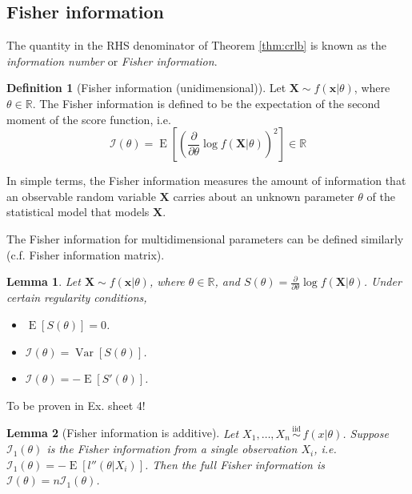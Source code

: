\documentclass[
]{book}
\providecommand{\tightlist}{%
  \setlength{\itemsep}{0pt}\setlength{\parskip}{0pt}}
\newcommand{\bx}{{\boldsymbol x}}
\newcommand{\bX}{{\boldsymbol X}}
\DeclareMathOperator{\E}{E}
\DeclareMathOperator{\Var}{Var}
\newcommand{\iid}{\,\overset{\text{iid}}{\sim}\,}
\newcommand{\bbR}{\mathbb{R}}
\newcommand{\cI}{{\mathcal I}}
\newtheorem{lemma}{Lemma}[chapter]
\theoremstyle{definition}
\newtheorem{definition}{Definition}[chapter]
\theoremstyle{definition}
\theoremstyle{definition}
\theoremstyle{definition}
\theoremstyle{remark}
\begin{document}
\hypertarget{fisher-information}{%
\subsection{Fisher information}\label{fisher-information}}

The quantity in the RHS denominator of Theorem \ref{thm:crlb} is known as the \emph{information number} or \emph{Fisher information}.

\begin{definition}[Fisher information (unidimensional)]
Let \(\bX\sim f(\bx|\theta)\), where \(\theta\in\bbR\).
The Fisher information is defined to be the expectation of the second
moment of the score function, i.e.
\[\cI(\theta) = \E\left[ \left( \frac{\partial}{\partial \theta} \log f(\bX|\theta) \right)^2 \right] \in \bbR\]
\end{definition}

In simple terms, the Fisher information measures the amount of information that an observable random variable \(\bX\) carries about an unknown parameter \(\theta\) of the statistical model that models \(\bX\).

The Fisher information for multidimensional parameters can be defined similarly (c.f. Fisher information matrix).

\begin{lemma}

Let \(\bX\sim f(\bx|\theta)\), where \(\theta\in\bbR\), and \(S(\theta)=\frac{\partial}{\partial \theta} \log f(\bX|\theta)\). Under certain regularity conditions,

\begin{itemize}
\tightlist
\item
  \(\E [S(\theta)] = 0\).
\item
  \(\cI(\theta) = \Var[S(\theta)]\).
\item
  \(\cI(\theta) = -\E[S'(\theta)]\).
\end{itemize}

\end{lemma}

To be proven in Ex. sheet 4!

\begin{lemma}[Fisher information is additive]
Let \(X_1,\dots,X_n\iid f(x|\theta)\). Suppose \(\cI_1(\theta)\) is the Fisher information from a single observation \(X_i\), i.e.~\(\cI_1(\theta) = -\E[l''(\theta|X_i)]\). Then the full Fisher information is \(\cI(\theta) = n\cI_1(\theta)\).
\end{lemma}
\end{document}

